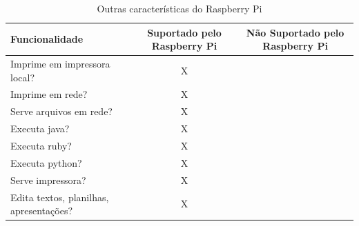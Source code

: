 \begin{table}[!htpb]
 \centering
    \begin{tabular}{|p{4cm}|c|c|} 
    \hline
        \textbf{Funcionalidade} & \textbf{Suportado pelo Raspberry Pi} & \textbf{Não Suportado pelo Raspberry Pi} \\
    \hline
        Imprime em impressora local? & X & \\
    \hline
        Imprime em rede? & X & \\
    \hline
        Serve arquivos em rede? & X & \\
    \hline
        Executa java? & X & \\
    \hline
        Executa ruby? & X & \\
    \hline
        Executa python? & X & \\
    \hline
        Serve impressora? & X & \\
    \hline
        Edita textos, planilhas, apresentações? & X & \\
    \hline
    \end{tabular}
    \caption{Outras características do Raspberry Pi}
    \label{t_fixa}
\end{table}
